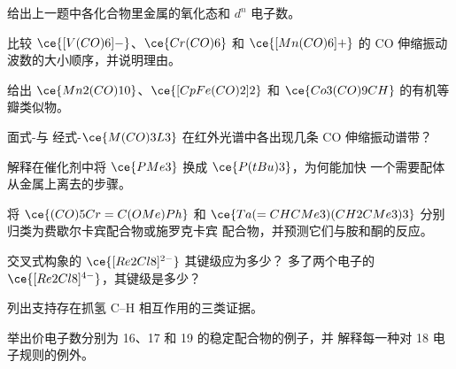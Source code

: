 \begin{exercise}[$\star$]\label{exo:b3:organometallic-bonding:2}
给出上一题中各化合物里金属的氧化态和
$d^n$ 电子数。
\end{exercise}

\begin{exercise}[$\star$]\label{exo:b3:organometallic-bonding:3}
比较 $\ce{[V(CO)6]-}$、$\ce{Cr(CO)6}$ 和 $\ce{[Mn(CO)6]+}$ 的 CO 伸缩振动波数的大小顺序，并说明理由。
\end{exercise}

\begin{exercise}[$\star$]\label{exo:b3:organometallic-bonding:4}
给出 $\ce{Mn2(CO)10}$、$\ce{[CpFe(CO)2]2}$ 和 $\ce{Co3(CO)9CH}$ 的有机等瓣类似物。
\end{exercise}

\begin{exercise}[$\star\star$]\label{exo:b3:organometallic-bonding:5}
$面式$-与 $经式$-$\ce{M(CO)3L3}$ 在红外光谱中各出现几条 CO 伸缩振动谱带？
\end{exercise}

\begin{exercise}[$\star\star$]\label{exo:b3:organometallic-bonding:6}
解释在催化剂中将 $\ce{PMe3}$ 换成 $\ce{P(tBu)3}$，为何能加快
一个需要配体从金属上离去的步骤。
\end{exercise}

\begin{exercise}[$\star\star$]\label{exo:b3:organometallic-bonding:7}
将 $\ce{(CO)5Cr=C(OMe)Ph}$ 和 $\ce{Ta(=CHCMe3)(CH2CMe3)3}$ 分别归类为费歇尔卡宾配合物或施罗克卡宾
配合物，并预测它们与胺和酮的反应。
\end{exercise}

\begin{exercise}[$\star\star$]\label{exo:b3:organometallic-bonding:8}
交叉式构象的 $\ce{[Re2Cl8]^{2-}}$ 其键级应为多少？
多了两个电子的 $\ce{[Re2Cl8]^{4-}}$，其键级是多少？
\end{exercise}

\begin{exercise}[$\star\star$]\label{exo:b3:organometallic-bonding:9}
列出支持存在抓氢 C--H 相互作用的三类证据。
\end{exercise}

\begin{exercise}[$\star\star\star$]\label{exo:b3:organometallic-bonding:10}
举出价电子数分别为 16、17 和 19 的稳定配合物的例子，并
解释每一种对 18 电子规则的例外。
\end{exercise}


